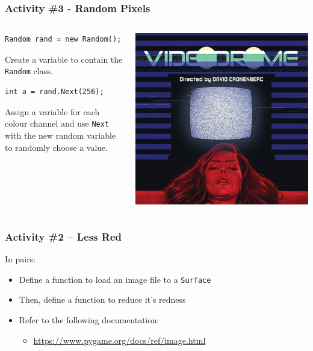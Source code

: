 \begin{frame}[fragile]
	\frametitle{Activity \#3 - Random Pixels}
\begin{columns}
	\begin{column}{0.48\textwidth}
	\begin{lstlisting}
Random rand = new Random();
	\end{lstlisting}
Create a variable to contain the \texttt{Random} class.
	\begin{lstlisting}
int a = rand.Next(256);
	\end{lstlisting}
Assign a variable for each colour channel and use \texttt{Next} with the new random variable to randomly choose a value.

\end{column}
 \begin{column}{0.48\textwidth}
\includegraphics[scale=0.14]{videodrome}
\end{column}
\end{columns}
\end{frame}

\begin{frame}
	\frametitle{Activity \#2 -- Less Red}
	
	In pairs:
	
	\vspace{2em}
	
	\begin{itemize}		
		\item Define a function to load an image file to a \texttt{Surface}
		\item Then, define a function to reduce it's redness
		\item Refer to the following documentation:
		\begin{itemize}
			\item \url{https://www.pygame.org/docs/ref/image.html}
		\end{itemize}
	\end{itemize}
\end{frame}

